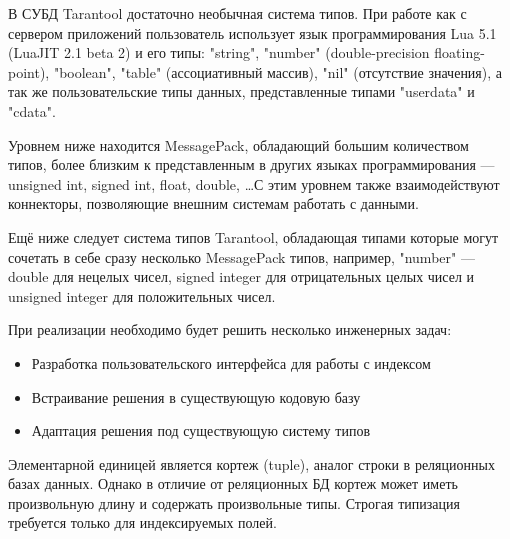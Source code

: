 В СУБД Tarantool достаточно необычная система типов.
При работе как с сервером приложений пользователь использует язык программирования
Lua 5.1 (LuaJIT 2.1 beta 2) и его типы: "string", "number" (double-precision floating-point),
"boolean", "table" (ассоциативный массив), "nil" (отсутствие значения),
а так же пользовательские типы данных, представленные типами "userdata" и "cdata".

Уровнем ниже находится MessagePack, обладающий большим количеством типов,
более близким к представленным в других языках программирования ---
unsigned int, signed int, float, double, \ldots С этим уровнем также взаимодействуют
коннекторы, позволяющие внешним системам работать с данными.

Ещё ниже следует система типов Tarantool, обладающая
типами которые могут сочетать в себе сразу несколько MessagePack типов, например,
"number" --- double для нецелых чисел, signed integer для отрицательных целых чисел
и unsigned integer для положительных чисел.

При реализации необходимо будет решить несколько инженерных задач:
\begin{itemize}
	\item Разработка пользовательского интерфейса для работы с индексом
	\item Встраивание решения в существующую кодовую базу
	\item Адаптация решения под существующую систему типов
\end{itemize}

Элементарной единицей является кортеж (tuple), аналог строки в
реляционных базах данных. Однако в отличие от реляционных БД
кортеж может иметь произвольную длину и содержать произвольные типы.
Строгая типизация требуется только для индексируемых полей.
